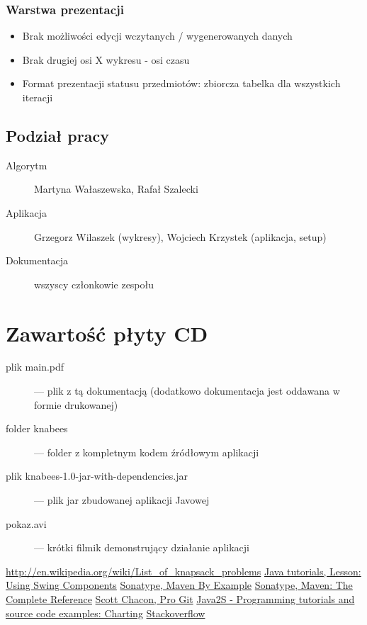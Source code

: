 \documentclass[a4paper,12pt,notitlepage]{mwrep}
\begin{document}
\subsection{Warstwa prezentacji}
\begin{itemize}
	\item	Brak możliwości edycji wczytanych / wygenerowanych danych
	\item	Brak drugiej osi X wykresu - osi czasu
	\item	Format prezentacji statusu przedmiotów: zbiorcza tabelka dla wszystkich iteracji
\end{itemize}

\section{Podział pracy}
\begin{description}
	\item[Algorytm] Martyna Wałaszewska, Rafał Szalecki
	\item[Aplikacja] Grzegorz Wilaszek (wykresy), Wojciech Krzystek (aplikacja, setup)
	\item[Dokumentacja] wszyscy członkowie zespołu
\end{description}


\addtocounter{page}{-1}

\appendix
\chapter*{Zawartość płyty CD}
\begin{description}
	\item[plik main.pdf]	 --- plik z tą dokumentacją (dodatkowo dokumentacja jest oddawana w formie drukowanej)
	\item[folder knabees]	 --- folder z kompletnym kodem źródłowym aplikacji
	\item[plik knabees-1.0-jar-with-dependencies.jar]	 --- plik jar zbudowanej aplikacji Javowej
	\item[pokaz.avi]	 --- krótki filmik demonstrujący działanie aplikacji
\end{description}

\begin{thebibliography}{9}

	\href{http://en.wikipedia.org/wiki/List_of_knapsack_problems}{http://en.wikipedia.org/wiki/List\_of\_knapsack\_problems}
	\href{http://docs.oracle.com/javase/tutorial/uiswing/components/index.html}{Java tutorials, Lesson: Using Swing Components}
	\href{http://www.sonatype.com/Support/Books/Maven-By-Example}{Sonatype, Maven By Example}
	\href{http://www.sonatype.com/Support/Books/Maven-The-Complete-Reference}{Sonatype, Maven: The Complete Reference}
	\href{http://git-scm.com/book/}{Scott Chacon, Pro Git}
	\href{http://www.java2s.com/Code/Java/Chart/CatalogChart.htm}{Java2S - Programming tutorials and source code examples: Charting}
	\href{http://stackoverflow.com/}{Stackoverflow}

\end{thebibliography}


\listoffigures


\label{LastPage}
\end{document}
